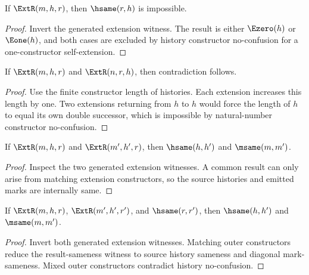 \begin{theorem}
\label{thm:extension-result-source-not-hsame}
If \(\ExtR(m,h,r)\), then \(\hsame(r,h)\) is impossible.
\end{theorem}
\begin{proof}
Invert the generated extension witness. The result is either \(\Ezero(h)\) or
\(\Eone(h)\), and both cases are excluded by history constructor
no-confusion for a one-constructor self-extension.
\end{proof}

\begin{theorem}
\label{thm:extension-two-step-cycle-absurd}
If \(\ExtR(m,h,r)\) and \(\ExtR(n,r,h)\), then contradiction follows.
\end{theorem}
\begin{proof}
Use the finite constructor length of histories. Each extension increases this
length by one. Two extensions returning from \(h\) to \(h\) would force the
length of \(h\) to equal its own double successor, which is impossible by
natural-number constructor no-confusion.
\end{proof}

\begin{theorem}
\label{thm:ext-result-injective-pair}
If \(\ExtR(m,h,r)\) and \(\ExtR(m',h',r)\), then \(\hsame(h,h')\) and \(\msame(m,m')\).
\end{theorem}
\begin{proof}
Inspect the two generated extension witnesses. A common result can only arise from matching extension constructors, so the source histories and emitted marks are internally same.
\end{proof}

\begin{theorem}
\label{thm:extension-result-hsame-injective-pair}
If \(\ExtR(m,h,r)\), \(\ExtR(m',h',r')\), and \(\hsame(r,r')\), then \(\hsame(h,h')\) and \(\msame(m,m')\).
\end{theorem}
\begin{proof}
Invert both generated extension witnesses. Matching outer constructors reduce
the result-sameness witness to source history sameness and diagonal
mark-sameness. Mixed outer constructors contradict history no-confusion.
\end{proof}

